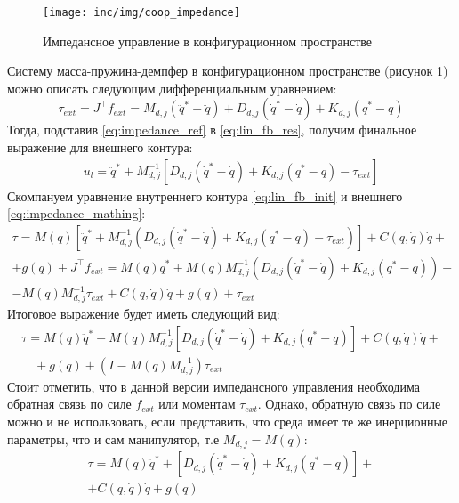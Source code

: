 \begin{figure}
  \centering
  \texttt{[image: inc/img/coop\_impedance]}
  \caption{Импедансное управление в конфигурационном пространстве}
  \label{fig:js_impedance}
\end{figure}
Систему масса-пружина-демпфер в конфигурационном пространстве (рисунок \ref{fig:js_impedance}) можно описать следующим дифференциальным уравнением:
\begin{equation}
  \tau_{ext} = J^\top f_{ext}  = M_{d,j}(\ddot{q}^* - \ddot{q}) +  D_{d,j} (\dot{q}^* - \dot{q}) + K_{d,j} (q^* - q)
  \label{eq:impedance_ref}
\end{equation}
Тогда, подставив \eqref{eq:impedance_ref} в \eqref{eq:lin_fb_res}, получим финальное выражение для внешнего контура:
\begin{align}
  u_{l} = \ddot{q}^* +   M_{d,j}^{-1}\left[ D_{d,j}(\dot{q}^* - \dot{q}) + K_{d,j} (q^* - q) - \tau_{ext} \right]
  \label{eq:impedance_mathing}
\end{align}
Скомпануем уравнение внутреннего контура \eqref{eq:lin_fb_init} и внешнего \eqref{eq:impedance_mathing}:
\begin{equation*}
  \begin{split}
    \tau = M(q) \left[ \ddot{q}^* + M_{d,j}^{-1}\left( D_{d,j}(\dot{q}^* - \dot{q}) + K_{d,j} (q^* - q) - \tau_{ext} \right) \right] + C(q,\dot{q})\dot{q}  +\\
     + g(q) + J^\top f_{ext} = M(q)\ddot{q}^* + M(q)M_{d,j}^{-1}\left( D_{d,j}(\dot{q}^* - \dot{q}) + K_{d,j} (q^* - q)\right) - \\
     - M(q)M_{d,j}^{-1}\tau_{ext} + C(q,\dot{q})\dot{q} + g(q) + \tau_{ext}
  \end{split}
\end{equation*}
Итоговое выражение будет иметь следующий вид:
\begin{equation}
  \begin{split}
    \tau = M(q)\ddot{q}^* + M(q)M_{d,j}^{-1}\left[ D_{d,j}(\dot{q}^* - \dot{q}) + K_{d,j} (q^* - q)\right] + C(q,\dot{q})\dot{q} +\\
      \quad + g(q) + \left(I - M(q)M_{d,j}^{-1}\right)\tau_{ext}
  \end{split}
  \label{eq:impedance_final}
\end{equation}
Стоит отметить, что в данной версии импедансного управления необходима обратная связь по силе $f_{ext}$ или моментам $\tau_{ext}$. Однако, обратную связь по силе можно и не использовать, если представить, что среда имеет те же инерционные параметры, что и сам манипулятор, т.е $M_{d,j} = M(q)$:
\begin{equation}
  \begin{split}
    \tau = M(q)\ddot{q}^* + \left[ D_{d,j}(\dot{q}^* - \dot{q}) + K_{d,j} (q^* - q)\right] +\\
     + C(q,\dot{q})\dot{q} + g(q)
  \end{split}
  \label{eq:impedance_without_fs}
\end{equation}



